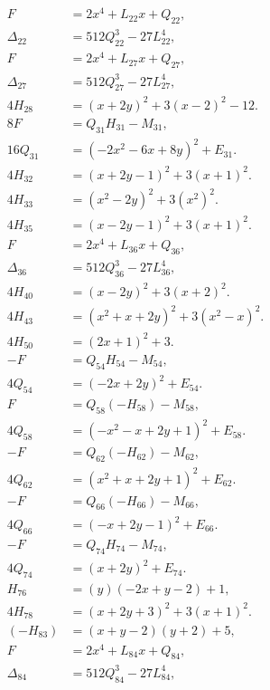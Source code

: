 \documentclass[11pt]{article}
\begin{document}
\begin{align}
F&=2x^4+L_{22}x+Q_{22},\label{eq:sign22}\\
\Delta_{22}&=512Q_{22}^3-27L_{22}^4,\label{eq:sign22b}\\
F&=2x^4+L_{27}x+Q_{27},\label{eq:sign27}\\
\Delta_{27}&=512Q_{27}^3-27L_{27}^4,\label{eq:sign27b}\\
4H_{28}&=(x+2y)^2+3(x-2)^2-12.\label{eq:sign28}\\
8F&=Q_{31}H_{31}-M_{31},\label{eq:sign31}\\
16Q_{31}&=(-2x^{2}-6x+8y)^2+E_{31}.\label{eq:sign31b}\\
4H_{32}&=(x+2y-1)^2+3(x+1)^2.\label{eq:sign32}\\
4H_{33}&=(x^{2}-2y)^2+3(x^{2})^2.\label{eq:sign33}\\
4H_{35}&=(x-2y-1)^2+3(x+1)^2.\label{eq:sign35}\\
F&=2x^4+L_{36}x+Q_{36},\label{eq:sign36}\\
\Delta_{36}&=512Q_{36}^3-27L_{36}^4,\label{eq:sign36b}\\
4H_{40}&=(x-2y)^2+3(x+2)^2.\label{eq:sign40}\\
4H_{43}&=(x^{2}+x+2y)^2+3(x^{2}-x)^2.\label{eq:sign43}\\
4H_{50}&=(2x+1)^2+3.\label{eq:sign50}\\
-F&=Q_{54}H_{54}-M_{54},\label{eq:sign54}\\
4Q_{54}&=(-2x+2y)^2+E_{54}.\label{eq:sign54b}\\
F&=Q_{58}(-H_{58})-M_{58},\label{eq:sign58}\\
4Q_{58}&=(-x^{2}-x+2y+1)^2+E_{58}.\label{eq:sign58b}\\
-F&=Q_{62}(-H_{62})-M_{62},\label{eq:sign62}\\
4Q_{62}&=(x^{2}+x+2y+1)^2+E_{62}.\label{eq:sign62b}\\
-F&=Q_{66}(-H_{66})-M_{66},\label{eq:sign66}\\
4Q_{66}&=(-x+2y-1)^2+E_{66}.\label{eq:sign66b}\\
-F&=Q_{74}H_{74}-M_{74},\label{eq:sign74}\\
4Q_{74}&=(x+2y)^2+E_{74}.\label{eq:sign74b}\\
H_{76}&=(y)(-2x+y-2)+1,\label{eq:sign76}\\
4H_{78}&=(x+2y+3)^2+3(x+1)^2.\label{eq:sign78}\\
(-H_{83})&=(x+y-2)(y+2)+5,\label{eq:sign83}\\
F&=2x^4+L_{84}x+Q_{84},\label{eq:sign84}\\
\Delta_{84}&=512Q_{84}^3-27L_{84}^4,\label{eq:sign84b}\\

\end{align}
\end{document}
